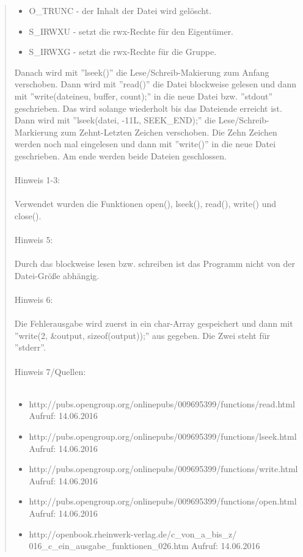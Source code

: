\begin{quote}
\begin{itemize}
				\item O\_TRUNC - der Inhalt der Datei wird gel\"oscht.\\
				\item S\_IRWXU - setzt die rwx-Rechte f\"ur den Eigent\"umer.\\
				\item S\_IRWXG - setzt die rwx-Rechte f\"ur die Gruppe.\\
			\end{itemize}
			Danach wird mit ''lseek()'' die Lese/Schreib-Makierung zum Anfang verschoben. Dann wird mit ''read()'' die Datei blockweise gelesen und dann mit ''write(dateineu, buffer, count);'' in die neue Datei bzw. ''stdout'' geschrieben. Das wird solange wiederholt bis das Dateiende erreicht ist. Dann wird mit ''lseek(datei, -11L, SEEK\_END);'' die Lese/Schreib-Markierung zum Zehnt-Letzten Zeichen verschoben. Die Zehn Zeichen werden noch mal eingelesen und dann mit ''write()'' in die neue Datei geschrieben. Am ende werden beide Dateien geschlossen.\\ \\
			Hinweis 1-3:\\ \\
			Verwendet wurden die Funktionen open(), lseek(), read(), write() und close().\\ \\
			Hinweis 5:\\ \\
			Durch das blockweise lesen bzw. schreiben ist das Programm nicht von der Datei-Gr\"oße abh\"angig.\\ \\
			Hinweis 6:\\ \\
			Die Fehlerausgabe wird zuerst in ein char-Array gespeichert und dann mit ''write(2, \&output, sizeof(output));'' aus gegeben. Die Zwei steht f\"ur ''stderr''.\\ \\
			Hinweis 7/Quellen:\\ \\
			\begin{itemize}
				\item http://pubs.opengroup.org/onlinepubs/009695399/functions/read.html Aufruf: 14.06.2016\\
				\item http://pubs.opengroup.org/onlinepubs/009695399/functions/lseek.html Aufruf: 14.06.2016\\
				\item http://pubs.opengroup.org/onlinepubs/009695399/functions/write.html Aufruf: 14.06.2016\\
				\item http://pubs.opengroup.org/onlinepubs/009695399/functions/open.html Aufruf: 14.06.2016\\
				\item http://openbook.rheinwerk-verlag.de/c\_von\_a\_bis\_z/\\016\_c\_ein\_ausgabe\_funktionen\_026.htm Aufruf: 14.06.2016\\
			\end{itemize}
		\end{quote}